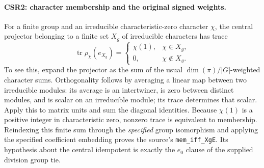 \paragraph{CSR2: character membership and the original signed weights.}
\label{claim:CSR2}
For a finite group and an irreducible characteristic-zero character
\(\chi\), the central projector belonging to a finite set \(X_g\)
of irreducible characters has trace
\[
 \operatorname{tr}\rho_\chi(e_{X_g})=
 \begin{cases}\chi(1),&\chi\in X_g,\\0,&\chi\notin X_g.\end{cases}
 \tag{CSR.4}
\]
To see this, expand the projector as the sum of the usual
\(\dim(\pi)/|G|\)-weighted character sums. Orthogonality follows
by averaging a linear map between two irreducible modules: its
average is an intertwiner, is zero between distinct modules, and
is scalar on an irreducible module; its trace determines that scalar.
Apply this to matrix units and sum the diagonal identities.
Because \(\chi(1)\) is a positive integer in characteristic zero,
nonzero trace is equivalent to membership. Reindexing this finite
sum through the \emph{specified} group isomorphism and applying the
specified coefficient embedding proves the source's
\texttt{mem\_iff\_XgE}. Its hypothesis about the central idempotent
is exactly the \(e_0\) clause of the supplied division group tie.


